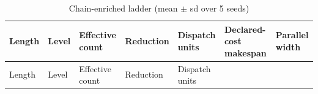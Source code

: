 \documentclass[
  11pt,
]{article}
\begin{document}
\begin{longtable}[]{@{}
  >{\raggedright\arraybackslash}p{}
  >{\raggedright\arraybackslash}p{}
  >{\raggedright\arraybackslash}p{}
  >{\raggedright\arraybackslash}p{}
  >{\raggedright\arraybackslash}p{}
  >{\raggedright\arraybackslash}p{}
  >{\raggedright\arraybackslash}p{}@{}}
\caption{Chain-enriched ladder (mean \(\pm\) sd over 5
seeds)}\tabularnewline
\toprule\noalign{}
\begin{minipage}[b]{\linewidth}\raggedright
Length
\end{minipage} & \begin{minipage}[b]{\linewidth}\raggedright
Level
\end{minipage} & \begin{minipage}[b]{\linewidth}\raggedright
Effective count
\end{minipage} & \begin{minipage}[b]{\linewidth}\raggedright
Reduction
\end{minipage} & \begin{minipage}[b]{\linewidth}\raggedright
Dispatch units
\end{minipage} & \begin{minipage}[b]{\linewidth}\raggedright
Declared-cost makespan
\end{minipage} & \begin{minipage}[b]{\linewidth}\raggedright
Parallel width
\end{minipage} \\
\midrule\noalign{}
\endfirsthead
\toprule\noalign{}
\begin{minipage}[b]{\linewidth}\raggedright
Length
\end{minipage} & \begin{minipage}[b]{\linewidth}\raggedright
Level
\end{minipage} & \begin{minipage}[b]{\linewidth}\raggedright
Effective count
\end{minipage} & \begin{minipage}[b]{\linewidth}\raggedright
Reduction
\end{minipage} & \begin{minipage}[b]{\linewidth}\raggedright
Dispatch units
\end{minipage} & \begin{minipage}[b]{\linewidth}\raggedright

\end{minipage}
\end{longtable}
\end{document}
